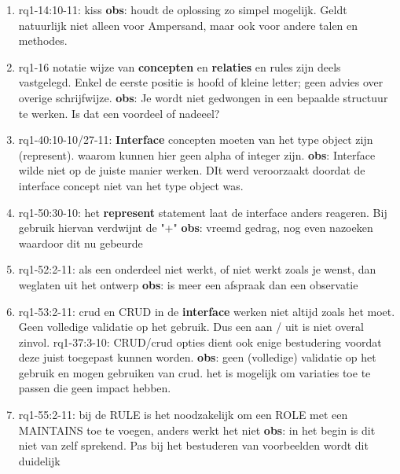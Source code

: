 \begin{enumerate}
    \item rq1-14:10-11: kiss
    \newline\textbf{obs}:  houdt de oplossing zo simpel mogelijk. 
    Geldt natuurlijk niet alleen voor Ampersand, maar ook voor andere talen en methodes.
    
    \item rq1-16 notatie wijze van \textbf{concepten} en \textbf{relaties} en rules zijn deels vastgelegd. Enkel de eerste positie is hoofd of kleine letter; geen advies over overige schrijfwijze.
    \newline\textbf{obs}: Je wordt niet gedwongen in een bepaalde structuur te werken. 
    Is dat een voordeel of  nadeeel?

    \item rq1-40:10-10/27-11: \textbf{Interface} concepten moeten van het type object zijn (represent). 
    waarom kunnen hier geen alpha of integer zijn.
    \newline\textbf{obs}: Interface wilde niet op de juiste manier werken. 
    DIt werd veroorzaakt doordat de interface concept niet van het type object was.
    
    \item rq1-50:30-10: het \textbf{represent} statement laat de interface anders reageren. Bij gebruik hiervan verdwijnt de "+"
    \newline\textbf{obs}: vreemd gedrag, nog even nazoeken waardoor dit nu gebeurde
    
    \item rq1-52:2-11: als een onderdeel niet werkt, of niet werkt zoals je wenst, dan weglaten uit het ontwerp
    \newline\textbf{obs}: is meer een afspraak dan een observatie
    
    \item rq1-53:2-11: crud en CRUD in de \textbf{interface} werken niet altijd zoals het moet. Geen volledige validatie op het gebruik. Dus een aan / uit is niet overal zinvol. 
    \newline rq1-37:3-10: CRUD/crud opties dient ook enige bestudering voordat deze juist toegepast kunnen worden.
    \newline\textbf{obs}: geen (volledige) validatie op het gebruik en mogen gebruiken van crud. 
    het is mogelijk om variaties toe te passen die geen impact hebben.
    
    \item rq1-55:2-11: bij de RULE  is het noodzakelijk om een ROLE met een MAINTAINS toe te voegen, anders werkt het niet
    \newline\textbf{obs}: in het begin is dit niet van zelf sprekend. 
    Pas bij het bestuderen van voorbeelden wordt dit duidelijk
    

\end{enumerate}

